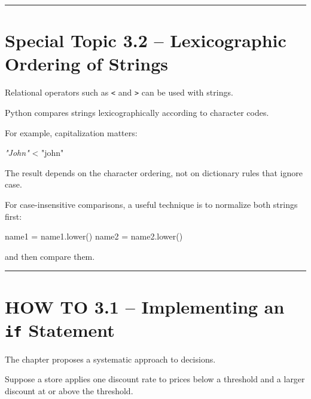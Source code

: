 \documentclass[
  11pt,
  a4paper,
]{article}
\newenvironment{Shaded}{}{}
\newcommand{\CommentTok}[1]{\textcolor[rgb]{0.38,0.63,0.69}{\textit{#1}}}
\newcommand{\NormalTok}[1]{#1}
\newcommand{\OperatorTok}[1]{\textcolor[rgb]{0.40,0.40,0.40}{#1}}
\newcommand{\StringTok}[1]{\textcolor[rgb]{0.25,0.44,0.63}{#1}}
\begin{document}
\begin{center}\rule{0.5\linewidth}{0.5pt}\end{center}

\section{Special Topic 3.2 -- Lexicographic Ordering of
Strings}\label{special-topic-3.2-lexicographic-ordering-of-strings}

Relational operators such as \texttt{\textless{}} and
\texttt{\textgreater{}} can be used with strings.

Python compares strings lexicographically according to character codes.

For example, capitalization matters:

\begin{Shaded}
\begin{Highlighting}[]
\CommentTok{"John"} \OperatorTok{\textless{}} \StringTok{"john"}
\end{Highlighting}
\end{Shaded}

The result depends on the character ordering, not on dictionary rules
that ignore case.

For case-insensitive comparisons, a useful technique is to normalize
both strings first:

\begin{Shaded}
\begin{Highlighting}[]
\NormalTok{name1 }\OperatorTok{=}\NormalTok{ name1.lower()}
\NormalTok{name2 }\OperatorTok{=}\NormalTok{ name2.lower()}
\end{Highlighting}
\end{Shaded}

and then compare them.

\begin{center}\rule{0.5\linewidth}{0.5pt}\end{center}

\section{\texorpdfstring{HOW TO 3.1 -- Implementing an \texttt{if}
Statement}{HOW TO 3.1 -- Implementing an if Statement}}\label{how-to-3.1-implementing-an-if-statement}

The chapter proposes a systematic approach to decisions.

Suppose a store applies one discount rate to prices below a threshold
and a larger discount at or above the threshold.
\end{document}
